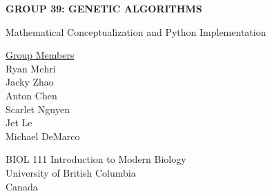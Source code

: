 \documentclass[letterpaper, reqno,11pt]{article}
\begin{document}

\begin{titlepage}
    \begin{center}
        \vspace*{8cm}
 
        \Huge
        \textbf{GROUP 39: GENETIC ALGORITHMS}
        
        \vspace{0.5cm}
        \LARGE
        Mathematical Conceptualization and Python Implementation
 
        \vspace{1.5cm}
 
        \vspace{0.5cm}
        \LARGE
 
 
        \vfill
 
       \underline {Group Members}\\
       \vspace{0.5cm}
        Ryan Mehri\\
        Jacky Zhao\\
        Anton Chen\\
        Scarlet Nguyen\\
        Jet Le\\
        Michael DeMarco
 
        \vspace{0.8cm}
 
 
        \Large
        BIOL 111 Introduction to Modern Biology\\
        University of British Columbia\\
        Canada\\
 
    \end{center}
\end{titlepage}







\end{document}
